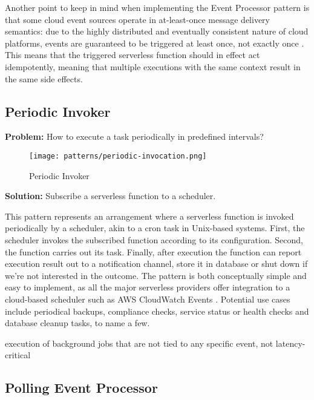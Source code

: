 Another point to keep in mind when implementing the Event Processor pattern is that some cloud event sources operate in at-least-once message delivery semantics: due to the highly distributed and eventually consistent nature of cloud platforms, events are guaranteed to be triggered at least once, not exactly once \parencite{awslambda0218}. This means that the triggered serverless function should in effect act idempotently, meaning that multiple executions with the same context result in the same side effects.

\subsection{Periodic Invoker} \label{subsec:periodicInvocation}

\textbf{Problem:} How to execute a task periodically in predefined intervals?

\begin{figure}[h]
  \centering
  \texttt{[image: patterns/periodic-invocation.png]}
  \caption{Periodic Invoker}
  \label{fig:patternPeriodicInvocation}
\end{figure}

\textbf{Solution:} Subscribe a serverless function to a scheduler.

This pattern represents an arrangement where a serverless function is invoked periodically by a scheduler, akin to a cron task in Unix-based systems. First, the scheduler invokes the subscribed function according to its configuration. Second, the function carries out its task. Finally, after execution the function can report execution result out to a notification channel, store it in database or shut down if we're not interested in the outcome. The pattern is both conceptually simple and easy to implement, as all the major serverless providers offer integration to a cloud-based scheduler such as AWS CloudWatch Events \parencite{awslambda0218}. Potential use cases include periodical backups, compliance checks, service status or health checks and database cleanup tasks, to name a few. \parencite{hong18securingviaserverlesspatterns}

execution of background jobs that are not tied to any specific event, not latency-critical

\subsection{Polling Event Processor} \label{subsec:PollingEventProcessor}

